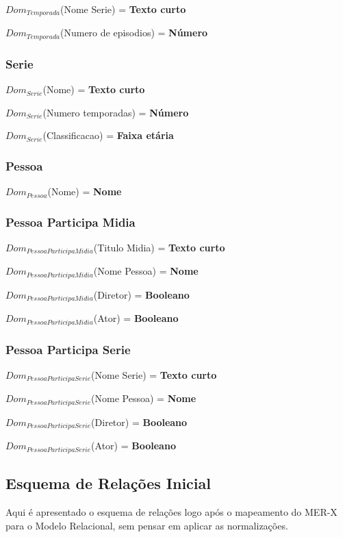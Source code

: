 \documentclass[12pt,a4paper]{article}
\newcommand{\createdomain}[3]{
    $Dom_{#1}$(#2) = {\bf #3}
}
\begin{document}
        \createdomain{Temporada}{Nome Serie}{Texto curto}

        \createdomain{Temporada}{Numero de episodios}{Número}


    \subsubsection{Serie}
        \createdomain{Serie}{Nome}{Texto curto}

        \createdomain{Serie}{Numero temporadas}{Número}

        \createdomain{Serie}{Classificacao}{Faixa etária}


    \subsubsection{Pessoa}
        \createdomain{Pessoa}{Nome}{Nome}


    \subsubsection{Pessoa Participa Midia}
        \createdomain{Pessoa Participa Midia}{Titulo Midia}{Texto curto}

        \createdomain{Pessoa Participa Midia}{Nome Pessoa}{Nome}

        \createdomain{Pessoa Participa Midia}{Diretor}{Booleano}

        \createdomain{Pessoa Participa Midia}{Ator}{Booleano}


    \subsubsection{Pessoa Participa Serie}
        \createdomain{Pessoa Participa Serie}{Nome Serie}{Texto curto}

        \createdomain{Pessoa Participa Serie}{Nome Pessoa}{Nome}

        \createdomain{Pessoa Participa Serie}{Diretor}{Booleano}

        \createdomain{Pessoa Participa Serie}{Ator}{Booleano}

\subsection{Esquema de Relações Inicial}
    
    Aqui é apresentado o esquema de relações logo após o mapeamento do MER-X para o Modelo Relacional, sem pensar em aplicar as normalizações.
    
\end{document}
